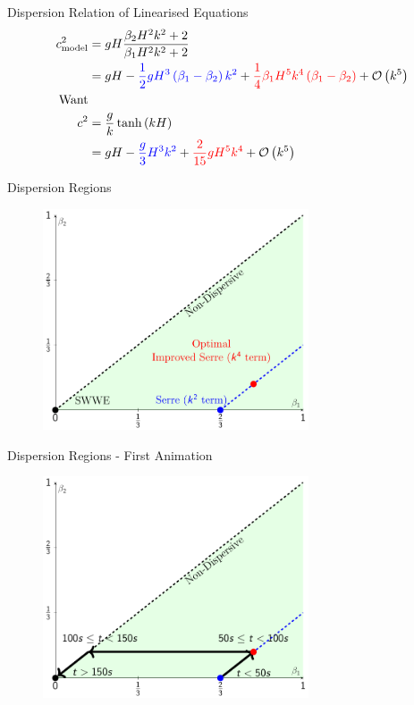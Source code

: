 \documentclass[pdf]{beamer}
\begin{document}
\begin{frame}{Dispersion Relation of Linearised Equations}
\begin{align*}
c_{\text{model}}^2 & = gH \dfrac{\beta_2 H^2 k^2 + 2}{ \beta_1H^2 k^2 + 2}
\\& = gH - {\color{blue} \frac{1}{2}gH^3 \left(\beta_1 - \beta_2\right)k^2} + {\color{red}\frac{1}{4}\beta_1 H^5 k^4\left(\beta_1 - \beta_2\right)}  + \mathcal{O}\left(k^5\right) \\
\text{Want} \\c^2  &= \frac{g}{k} \tanh\left(kH\right) \\
 &= gH - {\color{blue}\frac{g}{3} H^3 k^2} + {\color{red}\frac{2}{15} g H^5 k^4} + \mathcal{O}\left(k^5\right)
\end{align*}
\end{frame}

\begin{frame}{Dispersion Regions}
\begin{figure}
	\centering
	\includegraphics[width=0.7\textwidth]{./Pics/Tex/Explanatory/RegionsPlot/BetaPlotAll.pdf}
\end{figure}
\end{frame}

\begin{frame}{Dispersion Regions - First  Animation}
\begin{figure}
	\centering
	\includegraphics[width=0.7\textwidth]{./Pics/Tex/Explanatory/RegionsPlot/BetaPlotAllArrows.pdf}
\end{figure}
\end{frame}
\end{document}

